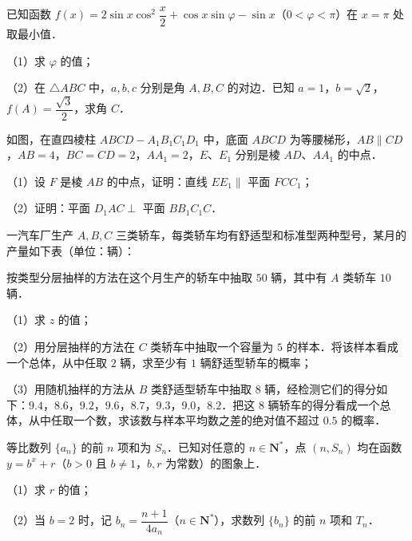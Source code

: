 \begin{question}
已知函数 $f(x)=2\sin x\cos^2\dfrac x2+\cos x\sin\varphi-\sin x$（$0<\varphi<\pi$）在 $x=\pi$ 处取最小值．

（1）求 $\varphi$ 的值；

（2）在 $\triangle ABC$ 中，$a,b,c$ 分别是角 $A,B,C$ 的对边．已知 $a=1$，$b=\sqrt2$，$f(A)=\dfrac{\sqrt3}{2}$，求角 $C$．

\Needspace{0.4\textheight}
\end{question}
\begin{question}
如图，在直四棱柱 $ABCD-A_1B_1C_1D_1$ 中，底面 $ABCD$ 为等腰梯形，$AB\parallel CD$，$AB=4$，$BC=CD=2$，$AA_1=2$，$E$、$E_1$ 分别是棱 $AD$、$AA_1$ 的中点．
\nopagebreak[4]
\begin{center}\end{center}
\nopagebreak[4]
（1）设 $F$ 是棱 $AB$ 的中点，证明：直线 $EE_1\parallel$ 平面 $FCC_1$；

（2）证明：平面 $D_1AC\perp$ 平面 $BB_1C_1C$．

\Needspace{0.4\textheight}
\end{question}
\begin{question}
一汽车厂生产 $A,B,C$ 三类轿车，每类轿车均有舒适型和标准型两种型号，某月的产量如下表（单位：辆）：
\nopagebreak[4]
\begin{center}\end{center}
\nopagebreak[4]
按类型分层抽样的方法在这个月生产的轿车中抽取 $50$ 辆，其中有 $A$ 类轿车 $10$ 辆．

（1）求 $z$ 的值；

（2）用分层抽样的方法在 $C$ 类轿车中抽取一个容量为 $5$ 的样本．将该样本看成一个总体，从中任取 $2$ 辆，求至少有 $1$ 辆舒适型轿车的概率；

（3）用随机抽样的方法从 $B$ 类舒适型轿车中抽取 $8$ 辆，经检测它们的得分如下：$9.4$，$8.6$，$9.2$，$9.6$，$8.7$，$9.3$，$9.0$，$8.2$．把这 $8$ 辆轿车的得分看成一个总体，从中任取一个数，求该数与样本平均数之差的绝对值不超过 $0.5$ 的概率．

\end{question}
\begin{question}
等比数列 $\{a_n\}$ 的前 $n$ 项和为 $S_n$．已知对任意的 $n\in\mathbf N^*$，点 $(n,S_n)$ 均在函数 $y=b^x+r$（$b>0$ 且 $b\neq1$，$b,r$ 为常数）的图象上．

（1）求 $r$ 的值；

（2）当 $b=2$ 时，记 $b_n=\dfrac{n+1}{4a_n}$（$n\in\mathbf N^*$），求数列 $\{b_n\}$ 的前 $n$ 项和 $T_n$．

\end{question}
